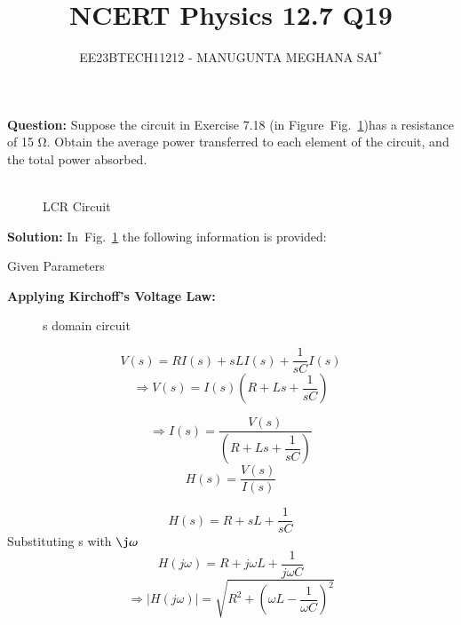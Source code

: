 \documentclass[journal,12pt,twocolumn]{IEEEtran}
\title{
	
\title{NCERT Physics 12.7 Q19}
\author{EE23BTECH11212 - MANUGUNTA MEGHANA SAI$^{*}$%
}


}
\newcommand\figref{Fig.~\ref}
\theoremstyle{remark}
\begin{document}
\maketitle

\textbf{Question:} 
Suppose the circuit in Exercise 7.18 (in Figure~\figref{fig:2})has a resistance of 15 Ω. Obtain the average power transferred to each element of the circuit, and the total power absorbed.\\
\\

\begin{figure}[h]
	\centering
	
	\caption{LCR Circuit}
	\label{fig:2}
\end{figure}
     
\textbf{Solution: }
In~\figref{fig:2} the following information is provided:
 
 

 \begin{table}[h]
 	\centering
 	\resizebox{6 cm}{!}{
 		
 	}
 	\vspace{6 pt}
 	\caption{Given Parameters}
 	\label{tab:my_label} 
 \end{table} 
 \textbf{Applying Kirchoff's Voltage Law:}
 
 \begin{figure}[!h]
 	\centering
 	
 	\caption{s domain circuit}
 	\label{fig:1}
 	
 \end{figure}
 \begin{equation}
 	V(s) = R I(s) + sL I(s) + \dfrac{1}{sC} I(s)
 \end{equation}
 \begin{equation}
 	\Rightarrow V(s) = I(s)\left(R + Ls + \dfrac{1}{sC}\right)
 \end{equation}
 
 \begin{equation}
 	\Rightarrow I(s) = \dfrac{V(s)}{\left(R + Ls + \dfrac{1}{sC}\right)} 
 \end{equation}
\begin{equation}
	H(s) = \dfrac{V(s)}{I(s)}
\end{equation}

\begin{equation}
	H(s) = R + sL + \dfrac{1}{sC}
\end{equation}
Substituting s with $\j \omega$
\begin{equation}
	H(j\omega) = R + j\omega L + \dfrac{1}{j\omega C}
\end{equation}
\begin{equation}
	\Rightarrow \lvert H(j\omega) \rvert = \sqrt{R^2 + \left(\omega L - \dfrac{1}{\omega C}\right)^2}
	\label{eq:1}
\end{equation}
\end{document}
